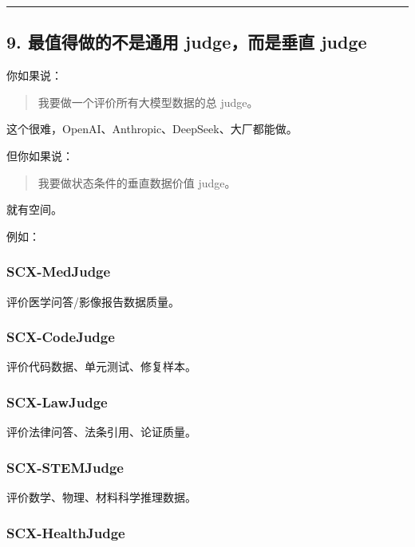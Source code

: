 \documentclass[
  12pt,
]{ctexart}
\begin{document}
\begin{center}\rule{0.5\linewidth}{0.5pt}\end{center}

\subsection{9. 最值得做的不是通用 judge，而是垂直
judge}\label{ux6700ux503cux5f97ux505aux7684ux4e0dux662fux901aux7528-judgeux800cux662fux5782ux76f4-judge}

你如果说：

\begin{quote}
我要做一个评价所有大模型数据的总 judge。
\end{quote}

这个很难，OpenAI、Anthropic、DeepSeek、大厂都能做。

但你如果说：

\begin{quote}
我要做状态条件的垂直数据价值 judge。
\end{quote}

就有空间。

例如：

\subsubsection{SCX-MedJudge}\label{scx-medjudge}

评价医学问答/影像报告数据质量。

\subsubsection{SCX-CodeJudge}\label{scx-codejudge}

评价代码数据、单元测试、修复样本。

\subsubsection{SCX-LawJudge}\label{scx-lawjudge}

评价法律问答、法条引用、论证质量。

\subsubsection{SCX-STEMJudge}\label{scx-stemjudge}

评价数学、物理、材料科学推理数据。

\subsubsection{SCX-HealthJudge}\label{scx-healthjudge}
\end{document}
